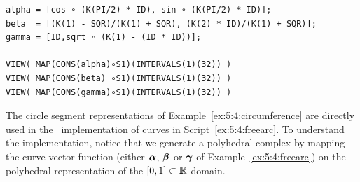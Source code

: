 \begin{coding}[Algebraic computation of FE = $\delta_1$]
{\begin{condition}
\begin{lstlisting}[language=JuliaLocal, style=julia, mathescape=true]
alpha = [cos ∘ (K(PI/2) * ID), sin ∘ (K(PI/2) * ID)];
beta  = [(K(1) - SQR)/(K(1) + SQR), (K(2) * ID)/(K(1) + SQR)]; 
gamma = [ID,sqrt ∘ (K(1) - (ID * ID))];

VIEW( MAP(CONS(alpha)∘S1)(INTERVALS(1)(32)) )
VIEW( MAP(CONS(beta) ∘S1)(INTERVALS(1)(32)) )
VIEW( MAP(CONS(gamma)∘S1)(INTERVALS(1)(32)) )
\end{lstlisting}
\end{condition}

The circle segment representations of Example~\ref{ex:5:4:circumference} are directly
used in the \pl\ implementation of curves in
Script~\ref{ex:5:4:freearc}.  To understand the implementation, notice
that we generate a polyhedral complex by mapping the curve vector
function (either ${\mbox{\boldmath $\alpha$}}$, ${\mbox{\boldmath $\beta$}}$ or ${\mbox{\boldmath $\gamma$}}$ of
Example~\ref{ex:5:4:freearc}) on the polyhedral representation of the
$[0,1]\subset\mathbb{I\!\!R}$ domain.




%
%
%



}
\end{coding}
